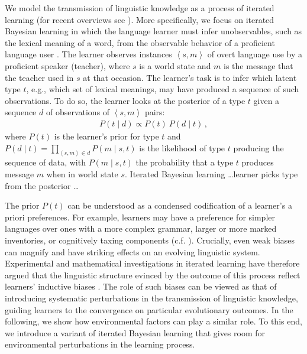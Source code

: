 \documentclass[10pt,a4paper]{article}
\newcommand{\tuple}[1]{\ensuremath{\left\langle #1 \right\rangle}}
\begin{document}
We model the transmission of linguistic knowledge as a process of iterated learning (for recent
overviews see \citealt{kirby+etal:2014, tamariz+kirby:2016}). More specifically, we focus on
iterated Bayesian learning in which the language learner must infer unobservables, such as the
lexical meaning of a word, from the observable behavior of a proficient language user
\citep[e.g.][]{griffiths+kalish:2007}. The learner observes instances $\tuple{s,m}$ of overt
language use by a proficient speaker (teacher), where $s$ is a world state and $m$ is the
message that the teacher used in $s$ at that occasion. The learner's task is to infer which
latent type $t$, e.g., which set of lexical meanings, may have produced a sequence of such
observations. To do so, the learner looks at the posterior of a type $t$ given a sequence $d$
of observations of $\tuple{s, m}$ pairs:
\begin{align*}
  P(t \mid d) \propto P(t) \ P(d \mid t)\,,
\end{align*}
where $P(t)$ is the learner's prior for type $t$ and
$P(d \mid t) = \prod_{\tuple{s,m} \in d} P(m \mid s, t)$ is the likelihood of type $t$
producing the sequence of data, with $P(m \mid s, t)$ the probability that a type $t$ produces
message $m$ when in world state $s$. Iterated Bayesian learning \dots learner picks type from
the posterior \dots


The prior $P(t)$ can be understood as a condensed codification of a learner's a priori
preferences. For example, learners may have a preference for simpler languages over ones with a
more complex grammar, larger or more marked inventories, or cognitively taxing components
(c.f. \citealt{feldman:2000,chater+vitanyi:2003, kirby+etal:2015}). Crucially, even weak biases
can magnify and have striking effects on an evolving linguistic system. Experimental and
mathematical investigations in iterated learning have therefore argued that the linguistic
structure evinced by the outcome of this process reflect learners' inductive biases
\citep{kirby+etal:2007,kirby+etal:2014}. The role of such biases can be viewed as that of
introducing systematic perturbations in the transmission of linguistic knowledge, guiding
learners to the convergence on particular evolutionary outcomes. In the following, we show how
environmental factors can play a similar role. To this end, we introduce a variant of iterated
Bayesian learning that gives room for environmental perturbations in the learning process.

\bigskip
\end{document}
